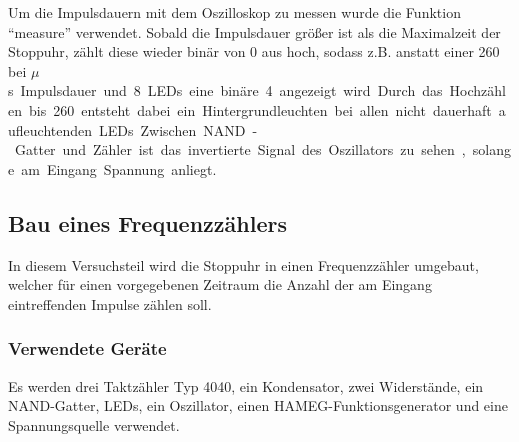 \documentclass[12pt,a4paper]{article}
\begin{document}
Um die Impulsdauern mit dem Oszilloskop zu messen wurde die Funktion "`measure"' verwendet. Sobald die Impulsdauer größer ist als die Maximalzeit der Stoppuhr, zählt diese wieder binär von 0 aus hoch, sodass z.B. anstatt einer 260 bei \unit[260]{$\mu$s} Impulsdauer und 8 LEDs eine binäre 4 angezeigt wird. Durch das Hochzählen bis 260 entsteht dabei ein Hintergrundleuchten bei allen nicht dauerhaft aufleuchtenden LEDs. Zwischen NAND-Gatter und Zähler ist das invertierte Signal des Oszillators zu sehen, solange am Eingang Spannung anliegt. 

\subsection{Bau eines Frequenzzählers}
In diesem Versuchsteil wird die Stoppuhr in einen Frequenzzähler umgebaut, welcher für einen vorgegebenen Zeitraum die Anzahl der am Eingang eintreffenden Impulse zählen soll.
\subsubsection*{Verwendete Geräte}
Es werden drei Taktzähler Typ 4040, ein Kondensator, zwei Widerstände, ein NAND-Gatter, LEDs, ein Oszillator, einen HAMEG-Funktionsgenerator und eine Spannungsquelle verwendet.
\end{document}
